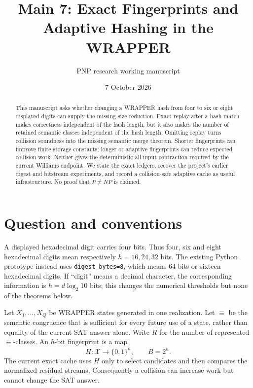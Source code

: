 \documentclass[11pt]{article}
\title{Main 7: Exact Fingerprints and Adaptive Hashing in the WRAPPER}
\author{PNP research working manuscript}
\date{7 October 2026}
\begin{document}
\maketitle

\begin{abstract}
This manuscript asks whether changing a WRAPPER hash from four to six or
eight displayed digits can supply the missing size reduction.  Exact replay
after a hash match makes correctness independent of the hash length, but it
also makes the number of retained semantic classes independent of the hash
length.  Omitting replay turns collision soundness into the missing semantic
merge theorem.  Shorter fingerprints can improve finite storage constants;
longer or adaptive fingerprints can reduce expected collision work.  Neither
gives the deterministic all-input contraction required by the current
Williams endpoint.  We state the exact ledgers, recover the project's earlier
digest and bitstream experiments, and record a collision-safe adaptive cache
as useful infrastructure.  No proof that $P\ne NP$ is claimed.
\end{abstract}

\section{Question and conventions}
A displayed hexadecimal digit carries four bits.  Thus four, six and eight
hexadecimal digits mean respectively $h=16,24,32$ bits.  The existing Python
prototype instead uses \texttt{digest\_bytes=8}, which means $64$ bits or
sixteen hexadecimal digits.  If ``digit'' means a decimal character, the
corresponding information is $h=d\log_2 10$ bits; this changes the numerical
thresholds but none of the theorems below.

Let $X_1,\ldots,X_Q$ be WRAPPER states generated in one realization.  Let
$\equiv$ be the semantic congruence that is sufficient for every future use
of a state, rather than equality of the current SAT answer alone.  Write $R$
for the number of represented $\equiv$-classes.  An $h$-bit fingerprint is a
map
\[
 H:\mathcal X\longrightarrow\{0,1\}^h,
 \qquad B=2^h.
\]
The current exact cache uses $H$ only to select candidates and then compares
the normalized residual streams.  Consequently a collision can increase
work but cannot change the SAT answer.
\end{document}

